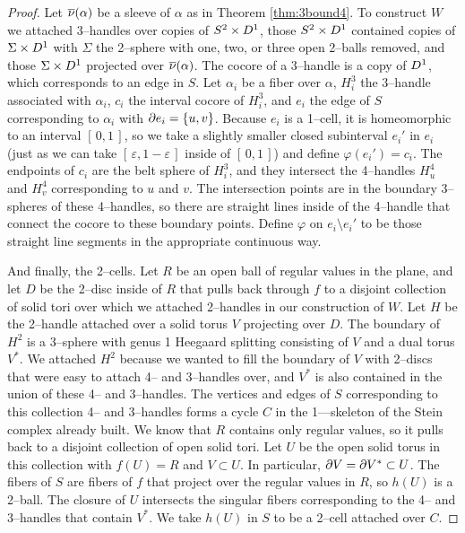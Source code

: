 \begin{proof}
	Let $\overline{\nu}(\alpha)$ be a sleeve of $\alpha$ as in Theorem \ref{thm:3bound4}.
	To construct $W$ we attached 3--handles over copies of $S^2\times D^1$, those $S^2\times D^1$ contained copies of $\Sigma\times D^1$ with $\Sigma$ the 2--sphere with one, two, or three open 2--balls removed, and those $\Sigma\times D^1$ projected over $\overline{\nu}(\alpha)$.
	The cocore of a 3--handle is a copy of $D^1$, which corresponds to an edge in $S$.
	Let $\alpha_i$ be a fiber over $\alpha$, $H_i^3$ the 3--handle associated with $\alpha_i$, $c_i$ the interval cocore of $H_i^3$, and $e_i$ the edge of $S$ corresponding to $\alpha_i$ with $\partial e_i=\{u,v\}$.
	Because $e_i$ is a 1--cell, it is homeomorphic to an interval $[\,0,1\,]$, so we take a slightly smaller closed subinterval $e_i'$ in $e_i$ (just as we can take $[\,\varepsilon,1-\varepsilon\,]$ inside of $[\,0,1\,]$) and define $\varphi(e_i')=c_i$.
	The endpoints of $c_i$ are the belt sphere of $H_i^3$, and they intersect the 4--handles $H_u^4$ and $H_v^4$ corresponding to $u$ and $v$.
	The intersection points are in the boundary 3--spheres of these 4--handles, so there are straight lines inside of the 4--handle that connect the cocore to these boundary points.
	Define $\varphi$ on $e_i\setminus e_i'$ to be those straight line segments in the appropriate continuous way.
	
	And finally, the 2--cells.
	Let $R$ be an open ball of regular values in the plane, and let $D$ be the 2--disc inside of $R$ that pulls back through $f$ to a disjoint collection of solid tori over which we attached 2--handles in our construction of $W$.
	Let $H$ be the 2--handle attached over a solid torus $V$ projecting over $D$.
	The boundary of $H^2$ is a 3--sphere with genus 1 Heegaard splitting consisting of $V$ and a dual torus $V^*$.
	We attached $H^2$ because we wanted to fill the boundary of $V$ with 2--discs that were easy to attach 4-- and 3--handles over, and $V^*$ is also contained in the union of these 4-- and 3--handles.
	The vertices and edges of $S$ corresponding to this collection 4-- and 3--handles forms a cycle $C$ in the 1---skeleton of the Stein complex already built.
	We know that $R$ contains only regular values, so it pulls back to a disjoint collection of open solid tori.
	Let $U$ be the open solid torus in this collection with $f(U)=R$ and $V\subset U$.
	In particular, $\partial V=\partial V^*\subset U$.
	The fibers of $S$ are fibers of $f$ that project over the regular values in $R$, so $h(U)$ is a 2--ball.
	The closure of $U$ intersects the singular fibers corresponding to the 4-- and 3--handles that contain $V^*$.
	We take $h(U)$ in $S$ to be a 2--cell attached over $C$.


\end{proof}
